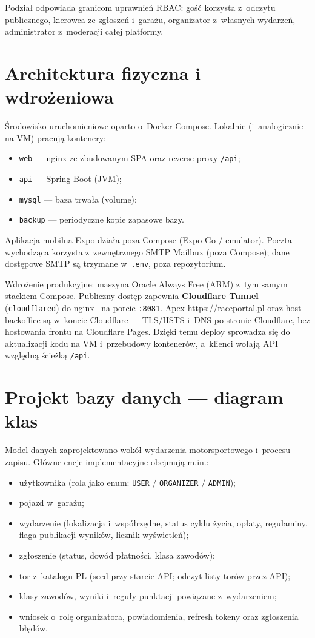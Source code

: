 \documentclass{sprz}
\begin{document}
Podział odpowiada granicom uprawnień RBAC: gość korzysta z~odczytu publicznego, kierowca ze zgłoszeń i~garażu, organizator z~własnych wydarzeń, administrator z~moderacji całej platformy.

\section{Architektura fizyczna i wdrożeniowa}
\label{sec:arch-fizyczna}
Środowisko uruchomieniowe oparto o~Docker Compose. Lokalnie (i~analogicznie na VM) pracują kontenery:
\begin{itemize}
  \item \texttt{web} --- nginx ze zbudowanym SPA oraz reverse proxy \texttt{/api};
  \item \texttt{api} --- Spring Boot (JVM);
  \item \texttt{mysql} --- baza trwała (volume);
  \item \texttt{backup} --- periodyczne kopie zapasowe bazy.
\end{itemize}
Aplikacja mobilna Expo działa poza Compose (Expo Go / emulator). Poczta wychodząca korzysta z~zewnętrznego SMTP Mailbux (poza Compose); dane dostępowe SMTP są trzymane w~\texttt{.env}, poza repozytorium.

Wdrożenie produkcyjne: maszyna Oracle Always Free (ARM) z~tym samym stackiem Compose. Publiczny dostęp zapewnia \textbf{Cloudflare Tunnel}~\cite{cloudflare:tunnel} (\texttt{cloudflared}) do nginx~\cite{nginx:docs} na porcie \texttt{:8081}. Apex \url{https://raceportal.pl} oraz host backoffice są w~koncie Cloudflare --- TLS/HSTS i~DNS po stronie Cloudflare, bez hostowania frontu na Cloudflare Pages. Dzięki temu deploy sprowadza się do aktualizacji kodu na VM i~przebudowy kontenerów, a~klienci wołają API względną ścieżką \texttt{/api}.

\section{Projekt bazy danych --- diagram klas}
\label{sec:diagram-klas}
Model danych zaprojektowano wokół wydarzenia motorsportowego i~procesu zapisu. Główne encje implementacyjne obejmują m.in.:
\begin{itemize}
  \item użytkownika (rola jako enum: \texttt{USER} / \texttt{ORGANIZER} / \texttt{ADMIN});
  \item pojazd w~garażu;
  \item wydarzenie (lokalizacja i~współrzędne, status cyklu życia, opłaty, regulaminy, flaga publikacji wyników, licznik wyświetleń);
  \item zgłoszenie (status, dowód płatności, klasa zawodów);
  \item tor z~katalogu PL (seed przy starcie API; odczyt listy torów przez API);
  \item klasy zawodów, wyniki i~reguły punktacji powiązane z~wydarzeniem;
  \item wniosek o~rolę organizatora, powiadomienia, refresh tokeny oraz zgłoszenia błędów.
\end{itemize}
\end{document}
